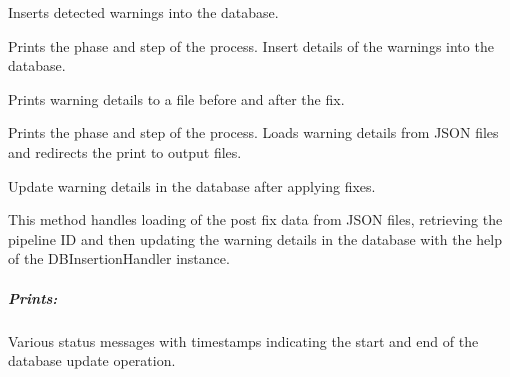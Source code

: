 \documentclass[letterpaper,10pt,english]{sphinxmanual}
\begin{document}
\begin{fulllineitems}
\begin{fulllineitems}
\label{\detokenize{main.ai_doxygen_cleaner:main.ai_doxygen_cleaner.ai_doxygen_cleaner.AIDoxygenCleaner.insert_warnings_to_db}}
\pysigstartsignatures
{}
\pysigstopsignatures
\sphinxAtStartPar
Inserts detected warnings into the database.

\sphinxAtStartPar
Prints the phase and step of the process.
Insert details of the warnings into the database.

\end{fulllineitems}


\begin{fulllineitems}
\label{\detokenize{main.ai_doxygen_cleaner:main.ai_doxygen_cleaner.ai_doxygen_cleaner.AIDoxygenCleaner.print_pre_post_fix_data_to_file}}
\pysigstartsignatures
{}
\pysigstopsignatures
\sphinxAtStartPar
Prints warning details to a file before and after the fix.

\sphinxAtStartPar
Prints the phase and step of the process.
Loads warning details from JSON files and redirects the print to output files.

\end{fulllineitems}


\begin{fulllineitems}
\label{\detokenize{main.ai_doxygen_cleaner:main.ai_doxygen_cleaner.ai_doxygen_cleaner.AIDoxygenCleaner.update_warnings_details_post_fix_in_db}}
\pysigstartsignatures
{}
\pysigstopsignatures
\sphinxAtStartPar
Update warning details in the database after applying fixes.

\sphinxAtStartPar
This method handles loading of the post fix data from JSON files, retrieving the pipeline ID and
then updating the warning details in the database with the help of the DBInsertionHandler instance.


\subparagraph{Prints:}
\label{\detokenize{main.ai_doxygen_cleaner:prints}}
\sphinxAtStartPar
Various status messages with timestamps indicating the start and end of the database update operation.

\end{fulllineitems}


\end{fulllineitems}
\end{document}
